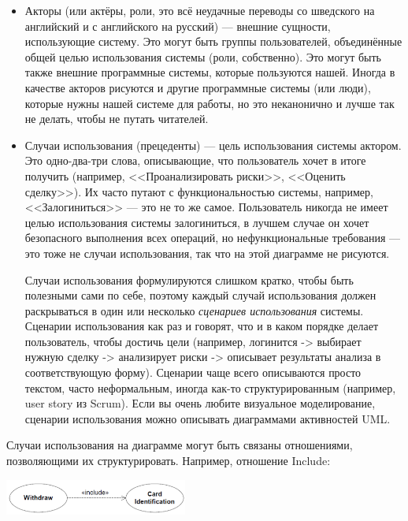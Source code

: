 \documentclass{../../text-style}
\begin{document}
\begin{itemize}
    \item Акторы (или актёры, роли, это всё неудачные переводы со шведского на английский и с английского на русский) --- внешние сущности, использующие систему. Это могут быть группы пользователей, объединённые общей целью использования системы (роли, собственно). Это могут быть также внешние программные системы, которые пользуются нашей. Иногда в качестве акторов рисуются и другие программные системы (или люди), которые нужны нашей системе для работы, но это неканонично и лучше так не делать, чтобы не путать читателей.
    \item Случаи использования (прецеденты)  --- цель использования системы актором. Это одно-два-три слова, описывающие, что пользователь хочет в итоге получить (например, <<Проанализировать риски>>, <<Оценить сделку>>). Их часто путают с функциональностью системы, например, <<Залогиниться>> --- это не то же самое. Пользователь никогда не имеет целью использования системы залогиниться, в лучшем случае он хочет безопасного выполнения всех операций, но нефункциональные требования --- это тоже не случаи использования, так что на этой диаграмме не рисуются.

    Случаи использования формулируются слишком кратко, чтобы быть полезными сами по себе, поэтому каждый случай использования должен раскрываться в один или несколько \textit{сценариев использования} системы. Сценарии использования как раз и говорят, что и в каком порядке делает пользователь, чтобы достичь цели (например, логинится -> выбирает нужную сделку -> анализирует риски -> описывает результаты анализа в соответствующую форму). Сценарии чаще всего описываются просто текстом, часто неформальным, иногда как-то структурированным (например, user story из Scrum). Если вы очень любите визуальное моделирование, сценарии использования можно описывать диаграммами активностей UML.
\end{itemize}

Случаи использования на диаграмме могут быть связаны отношениями, позволяющими их структурировать. Например, отношение Include:

\begin{center}
    \includegraphics[width=0.45\textwidth]{useCaseInclude.png}
\end{center}
\end{document}
